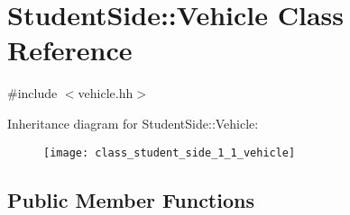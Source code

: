 \hypertarget{class_student_side_1_1_vehicle}{\section{Student\-Side\-:\-:Vehicle Class Reference}
\label{class_student_side_1_1_vehicle}
}


{\ttfamily \#include $<$vehicle.\-hh$>$}

Inheritance diagram for Student\-Side\-:\-:Vehicle\-:\begin{figure}[H]
\begin{center}
\leavevmode
\texttt{[image: class\_student\_side\_1\_1\_vehicle]}
\end{center}
\end{figure}
\subsection*{Public Member Functions}
